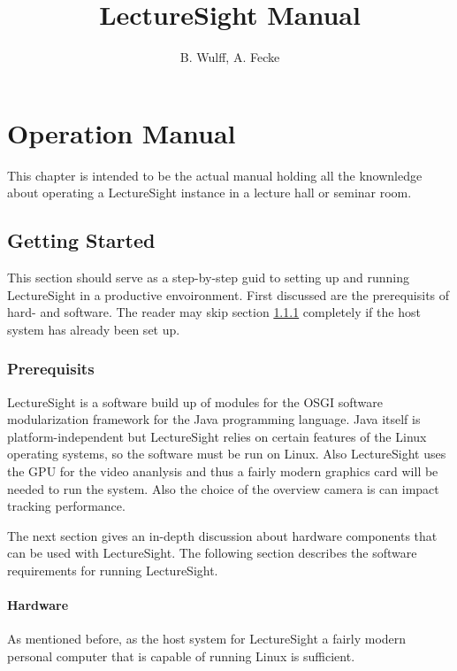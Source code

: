 \documentclass[a4paper,10pt]{book}
\begin{document}
\author{B. Wulff, A. Fecke}
\title{LectureSight Manual}

\frontmatter
\tableofcontents

\mainmatter

\chapter{Operation Manual}

This chapter is intended to be the actual manual holding all the knownledge about operating a LectureSight instance in a lecture hall or seminar room.

\section{Getting Started}

This section should serve as a step-by-step guid to setting up and running LectureSight in a productive envoironment. First discussed are the prerequisits of hard- and software. The reader may skip section \ref{subsec-prerequisits} completely if the host system has already been set up.

\subsection{Prerequisits}
\label{subsec-prerequisits}

LectureSight is a software build up of modules for the OSGI software modularization framework \cite{alliance2007osgi} for the Java programming language. Java itself is platform-independent but LectureSight relies on certain features of the Linux operating systems, so the software must be run on Linux. Also LectureSight uses the GPU for the video ananlysis and thus a fairly modern graphics card will be needed to run the system. Also the choice of the overview camera is can impact tracking performance.

The next section gives an in-depth discussion about hardware  components that can be used with LectureSight. The following section describes the software requirements for running LectureSight.

\subsubsection{Hardware}

As mentioned before, as the host system for LectureSight a fairly modern personal computer that is capable of running Linux is sufficient.
\end{document}

